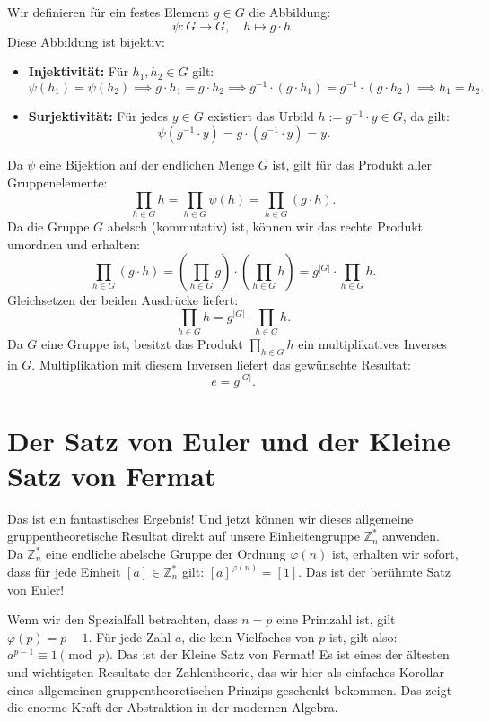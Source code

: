 \begin{math-stroke}
\begin{short-proof}
Wir definieren für ein festes Element $g \in G$ die Abbildung:
\[
\psi \colon G \to G, \quad h \mapsto g \cdot h.
\]
Diese Abbildung ist bijektiv:
\begin{itemize}
    \item \textbf{Injektivität:} Für $h_1, h_2 \in G$ gilt:
    \[
    \psi(h_1) = \psi(h_2) \implies g \cdot h_1 = g \cdot h_2 \implies g^{-1} \cdot (g \cdot h_1) = g^{-1} \cdot (g \cdot h_2) \implies h_1 = h_2.
    \]
    \item \textbf{Surjektivität:} Für jedes $y \in G$ existiert das Urbild $h := g^{-1} \cdot y \in G$, da gilt:
    \[
    \psi(g^{-1} \cdot y) = g \cdot (g^{-1} \cdot y) = y.
    \]
\end{itemize}
Da $\psi$ eine Bijektion auf der endlichen Menge $G$ ist, gilt für das Produkt aller Gruppenelemente:
\[
\prod_{h \in G} h = \prod_{h \in G} \psi(h) = \prod_{h \in G} (g \cdot h).
\]
Da die Gruppe $G$ abelsch (kommutativ) ist, können wir das rechte Produkt umordnen und erhalten:
\[
\prod_{h \in G} (g \cdot h) = \left( \prod_{h \in G} g \right) \cdot \left( \prod_{h \in G} h \right) = g^{|G|} \cdot \prod_{h \in G} h.
\]
Gleichsetzen der beiden Ausdrücke liefert:
\[
\prod_{h \in G} h = g^{|G|} \cdot \prod_{h \in G} h.
\]
Da $G$ eine Gruppe ist, besitzt das Produkt $\prod_{h \in G} h$ ein multiplikatives Inverses in $G$. Multiplikation mit diesem Inversen liefert das gewünschte Resultat:
\[
e = g^{|G|}.
\]
\end{short-proof}
\end{math-stroke}

\section{Der Satz von Euler und der Kleine Satz von Fermat}

\begin{spoken-clean}[00:44:16 - 00:46:56]
Das ist ein fantastisches Ergebnis! Und jetzt können wir dieses allgemeine gruppentheoretische Resultat direkt auf unsere Einheitengruppe $\mathbb{Z}_n^*$ anwenden. Da $\mathbb{Z}_n^*$ eine endliche abelsche Gruppe der Ordnung $\varphi(n)$ ist, erhalten wir sofort, dass für jede Einheit $[a] \in \mathbb{Z}_n^*$ gilt: $[a]^{\varphi(n)} = [1]$. Das ist der berühmte Satz von Euler!

Wenn wir den Spezialfall betrachten, dass $n = p$ eine Primzahl ist, gilt $\varphi(p) = p - 1$. Für jede Zahl $a$, die kein Vielfaches von $p$ ist, gilt also: $a^{p-1} \equiv 1 \pmod p$. Das ist der Kleine Satz von Fermat! Es ist eines der ältesten und wichtigsten Resultate der Zahlentheorie, das wir hier als einfaches Korollar eines allgemeinen gruppentheoretischen Prinzips geschenkt bekommen. Das zeigt die enorme Kraft der Abstraktion in der modernen Algebra.
\end{spoken-clean}

